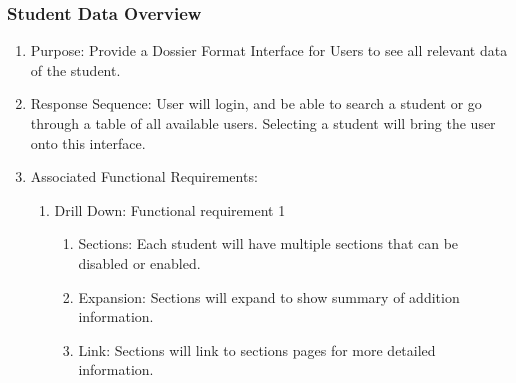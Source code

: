 \documentclass{journal}
\begin{document}
\subsubsection{Student Data Overview}
\begin{enumerate}
\item Purpose: Provide a Dossier Format Interface for Users to see all relevant data of the student.
\item Response Sequence: User will login, and be able to search a student or go through a table of all available users. Selecting a student will bring the user onto this interface.
\item Associated Functional Requirements:
\begin{enumerate}
\item Drill Down: Functional requirement 1
\begin{enumerate}
\item Sections: Each student will have multiple sections that can be disabled or enabled.
\item Expansion: Sections will expand to show summary of addition information.
\item Link: Sections will link to sections pages for more detailed information.
\end{enumerate}
\end{enumerate}
\end{enumerate}
\end{document}
